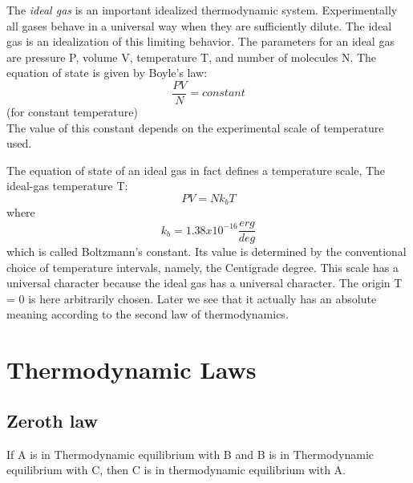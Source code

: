 \begin{definition}
    The \emph{ideal gas} is an important idealized thermodynamic system. Experimentally all gases behave in a universal way when they are sufficiently dilute. The ideal gas is an idealization of this limiting behavior. The parameters for an ideal gas are pressure P, volume V, temperature T, and number of molecules N. The equation of state is given by Boyle's law:
    \[
        \frac{PV}{N} = constant  
    \] (for constant temperature)\\
    The value of this constant depends on the experimental scale of temperature used.
\end{definition}
\begin{definition}
    The equation of state of an ideal gas in fact defines a temperature scale, The ideal-gas temperature T:
    \[
        PV = N k_{b}  T
    \]
    where
    \[
        k_{b} = 1.38 x 10^{-16} \frac{erg}{deg} 
    \]
    which is called Boltzmann's constant. Its value is determined by the conventional choice of temperature intervals, namely, the Centigrade degree. This scale has a universal character because the ideal gas has a universal character. The origin T = 0 is here arbitrarily chosen. Later we see that it actually has an absolute meaning according to the second law of thermodynamics.
\end{definition}
\section{Thermodynamic Laws}
\subsection{Zeroth law }
\begin{definition}
    If A is in Thermodynamic equilibrium with B and B is in Thermodynamic equilibrium with C, then C is in thermodynamic equilibrium with A. 
\end{definition}
